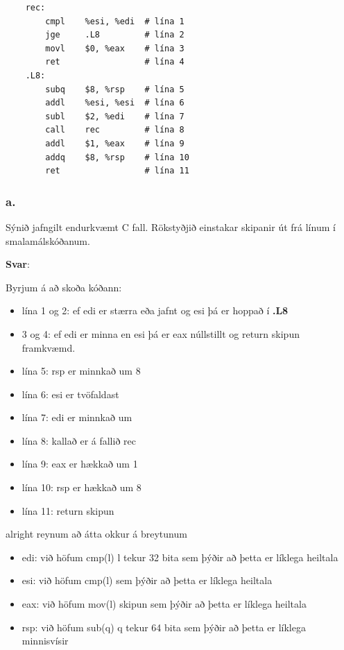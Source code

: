 \documentclass{article}
\begin{document}
\begin{verbatim}
    rec:
        cmpl    %esi, %edi  # lína 1
        jge     .L8         # lína 2
        movl    $0, %eax    # lína 3
        ret                 # lína 4
    .L8:
        subq    $8, %rsp    # lína 5
        addl    %esi, %esi  # lína 6
        subl    $2, %edi    # lína 7
        call    rec         # lína 8
        addl    $1, %eax    # lína 9
        addq    $8, %rsp    # lína 10
        ret                 # lína 11

\end{verbatim}

\subsubsection{a.} Sýnið jafngilt endurkvæmt C fall. Rökstyðjið einstakar skipanir út frá línum í
smalamálskóðanum.

\textbf{Svar}:

Byrjum á að skoða kóðann: 

\begin{itemize}
    \item lína 1 og 2: ef edi er stærra eða jafnt og esi þá er hoppað í \textbf{.L8}
    \item 3 og 4: ef edi er minna en esi þá er eax núllstillt og return skipun framkvæmd.
    \item lína 5: rsp er minnkað um 8
    \item lína 6: esi er tvöfaldast
    \item lína 7: edi er minnkað um 
    \item lína 8: kallað er á fallið rec
    \item lína 9: eax er hækkað um 1
    \item lína 10: rsp er hækkað um 8
    \item lína 11: return skipun
\end{itemize}

alright reynum að átta okkur á breytunum

\begin{itemize}
    \item edi: við höfum cmp(l) l tekur 32 bita sem þýðir að þetta er líklega heiltala 
    \item esi: við höfum cmp(l) sem þýðir að þetta er líklega heiltala
    \item eax: við höfum mov(l) skipun sem þýðir að þetta er líklega heiltala
    \item rsp: við höfum sub(q) q tekur 64 bita sem þýðir að þetta er líklega minnisvísir
\end{itemize}
\end{document}
